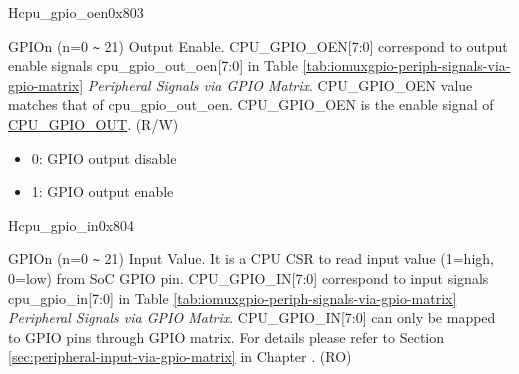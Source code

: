 \begin{register}{H}{cpu\_gpio\_oen}{0x803}\label{regdesc:GPIO_OEN}
%
%
%
%
%
%
%
%
%
\regnewline%
\begin{regdesc}\begin{reglist}
\label{fielddesc:GPIO_OEN}\item [CPU\_GPIO\_OEN] GPIOn (n=0 \verb+~+ 21) Output Enable. CPU\_GPIO\_OEN[7:0] correspond to output enable signals cpu\_gpio\_out\_oen[7:0] in Table \ref{tab:iomuxgpio-periph-signals-via-gpio-matrix} \textit{Peripheral Signals via GPIO Matrix}. CPU\_GPIO\_OEN value matches that of cpu\_gpio\_out\_oen.
\newline CPU\_GPIO\_OEN is the enable signal of \hyperref[fielddesc:GPIO_OUT]{CPU\_GPIO\_OUT}. (R/W)

\begin{itemize}
    \setlength\itemsep{-1em}
    \item 0: GPIO output disable
    \item 1: GPIO output enable
\end{itemize}
\end{reglist}\end{regdesc}
\end{register}

\begin{register}{H}{cpu\_gpio\_in}{0x804}\label{regdesc:GPIO_IN}
%
%
%
%
%
%
%
%
%
\regnewline%
\begin{regdesc}\begin{reglist}
\label{fielddesc:GPIO_IN}\item [CPU\_GPIO\_IN] GPIOn (n=0 \verb+~+ 21) Input Value. It is a CPU CSR to read input value (1=high, 0=low) from SoC GPIO pin.
\newline CPU\_GPIO\_IN[7:0] correspond to input signals cpu\_gpio\_in[7:0] in Table \ref{tab:iomuxgpio-periph-signals-via-gpio-matrix} \textit{Peripheral Signals via GPIO Matrix}.
\newline CPU\_GPIO\_IN[7:0] can only be mapped to GPIO pins through GPIO matrix. For details please refer to Section \ref{sec:peripheral-input-via-gpio-matrix} in Chapter \textit{}. (RO) 
\end{reglist}\end{regdesc}
\end{register}


